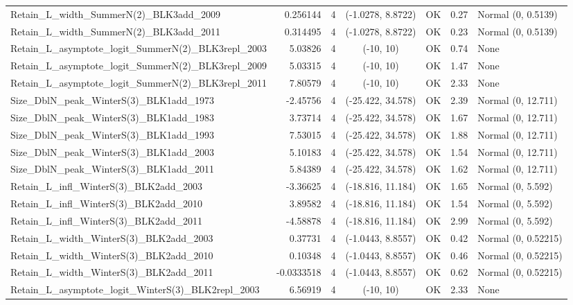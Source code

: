 \documentclass[12pt,]{article}
\begin{document}
\begin{landscape}
\begin{longtable}{lrcccll}
  Retain\_L\_width\_SummerN(2)\_BLK3add\_2009 & 0.256144 & 4 & (-1.0278, 8.8722) & OK & 0.27 & Normal (0, 0.5139) \\ 
  Retain\_L\_width\_SummerN(2)\_BLK3add\_2011 & 0.314495 & 4 & (-1.0278, 8.8722) & OK & 0.23 & Normal (0, 0.5139) \\ 
  Retain\_L\_asymptote\_logit\_SummerN(2)\_BLK3repl\_2003 & 5.03826 & 4 & (-10, 10) & OK & 0.74 & None \\ 
  Retain\_L\_asymptote\_logit\_SummerN(2)\_BLK3repl\_2009 & 5.03315 & 4 & (-10, 10) & OK & 1.47 & None \\ 
  Retain\_L\_asymptote\_logit\_SummerN(2)\_BLK3repl\_2011 & 7.80579 & 4 & (-10, 10) & OK & 2.33 & None \\ 
  Size\_DblN\_peak\_WinterS(3)\_BLK1add\_1973 & -2.45756 & 4 & (-25.422, 34.578) & OK & 2.39 & Normal (0, 12.711) \\ 
  Size\_DblN\_peak\_WinterS(3)\_BLK1add\_1983 & 3.73714 & 4 & (-25.422, 34.578) & OK & 1.67 & Normal (0, 12.711) \\ 
  Size\_DblN\_peak\_WinterS(3)\_BLK1add\_1993 & 7.53015 & 4 & (-25.422, 34.578) & OK & 1.88 & Normal (0, 12.711) \\ 
  Size\_DblN\_peak\_WinterS(3)\_BLK1add\_2003 & 5.10183 & 4 & (-25.422, 34.578) & OK & 1.54 & Normal (0, 12.711) \\ 
  Size\_DblN\_peak\_WinterS(3)\_BLK1add\_2011 & 5.84389 & 4 & (-25.422, 34.578) & OK & 1.62 & Normal (0, 12.711) \\ 
  Retain\_L\_infl\_WinterS(3)\_BLK2add\_2003 & -3.36625 & 4 & (-18.816, 11.184) & OK & 1.65 & Normal (0, 5.592) \\ 
  Retain\_L\_infl\_WinterS(3)\_BLK2add\_2010 & 3.89582 & 4 & (-18.816, 11.184) & OK & 1.54 & Normal (0, 5.592) \\ 
  Retain\_L\_infl\_WinterS(3)\_BLK2add\_2011 & -4.58878 & 4 & (-18.816, 11.184) & OK & 2.99 & Normal (0, 5.592) \\ 
  Retain\_L\_width\_WinterS(3)\_BLK2add\_2003 & 0.37731 & 4 & (-1.0443, 8.8557) & OK & 0.42 & Normal (0, 0.52215) \\ 
  Retain\_L\_width\_WinterS(3)\_BLK2add\_2010 & 0.10348 & 4 & (-1.0443, 8.8557) & OK & 0.46 & Normal (0, 0.52215) \\ 
  Retain\_L\_width\_WinterS(3)\_BLK2add\_2011 & -0.0333518 & 4 & (-1.0443, 8.8557) & OK & 0.62 & Normal (0, 0.52215) \\ 
  Retain\_L\_asymptote\_logit\_WinterS(3)\_BLK2repl\_2003 & 6.56919 & 4 & (-10, 10) & OK & 2.33 & None \\ 

\end{longtable}
\end{landscape}
\end{document}
